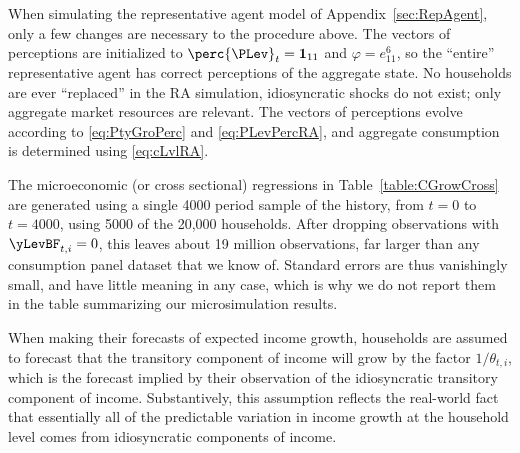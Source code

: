 When simulating the representative agent model of Appendix~\ref{sec:RepAgent},
only a few changes are necessary to the procedure above.  The vectors of
perceptions are initialized to $\perc{\PLev}_t = \mathbf{1}_{11}$ and $\varphi = e^6_{11}$,
so the ``entire'' representative agent has correct perceptions of the aggregate state.
No households are ever ``replaced'' in the RA simulation, idiosyncratic shocks do
not exist; only aggregate market resources are relevant.  The vectors of perceptions
evolve according to \eqref{eq:PtyGroPerc} and \eqref{eq:PLevPercRA}, and
aggregate consumption is determined using \eqref{eq:cLvlRA}.

The microeconomic (or cross sectional) regressions in Table~\ref{table:CGrowCross} are generated using a single 4000 period sample of the history, from $t=0$ to $t=4000$, using 5000 of the 20,000 households.  After dropping observations with $\yLevBF_{t,i}=0$, this leaves about 19 million observations, far larger than any consumption panel dataset that we know of.  Standard errors are thus vanishingly small, and have little meaning in any case, which is why we do not report them in the table summarizing our microsimulation results.

When making their forecasts of expected income growth, households are assumed
to forecast that the transitory component of income will grow by the factor
$1/\theta_{t,i}$, which is the forecast implied by their
observation of the idiosyncratic transitory
component of income.  Substantively, this assumption reflects the real-world fact that
essentially all of the predictable variation in income growth at the
household level comes from idiosyncratic components of income.

